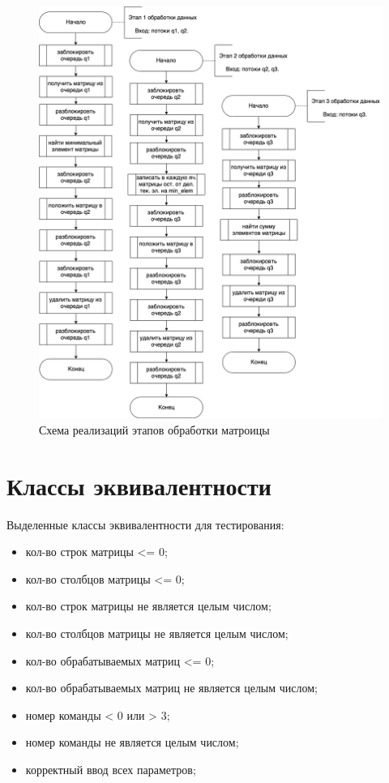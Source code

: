 \documentclass[a4paper,14pt, unknownkeysallowed]{extreport}
\begin{document}
\begin{figure}[h]
	\centering
	\includegraphics[scale=0.5]{img/stages.png}
	\caption{Схема реализаций этапов обработки матроицы}
	\label{fig:stages}
\end{figure} 

\clearpage

\section{Классы эквивалентности}

Выделенные классы эквивалентности для тестирования:

\begin{itemize}
	\item кол-во строк матрицы <= 0;
	\item кол-во столбцов матрицы <= 0;
	\item кол-во строк матрицы не является целым числом;
	\item кол-во столбцов матрицы не является целым числом;
	\item кол-во обрабатываемых матриц <= 0;
	\item кол-во обрабатываемых матриц не является целым числом;
	\item номер команды < 0 или > 3;
	\item номер команды не является целым числом;
	\item корректный ввод всех параметров;
\end{itemize}
\end{document}
